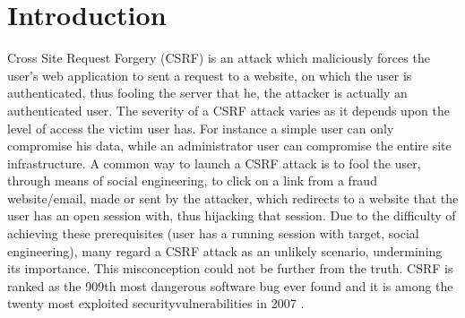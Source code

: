 \section{Introduction} 


Cross Site Request Forgery (CSRF) is an attack which maliciously forces the user's web application to sent a
request to a website, on which the user is authenticated, thus fooling the server that he, the attacker is 
actually an authenticated user.  The severity of a CSRF attack varies as it depends upon the level of access
the victim user has. For instance a simple user can only compromise his data, while an administrator user can
compromise the entire site infrastructure.  A common way to launch a CSRF attack is to fool the user, through
means of social engineering, to click on a link from a fraud website/email, made or sent by the attacker, 
which redirects to a website that the user has an open session with, thus hijacking that session.  Due to
the difficulty of achieving these prerequisites (user has a running session with target, social engineering),
many regard a CSRF attack as an unlikely scenario, undermining its importance.  This misconception could not
be further from the truth.  CSRF is ranked as the 909th most dangerous software bug ever found \cite{website:wiki-csrf-sever}
and it is among the twenty most exploited security\-vulnerabilities in 2007 \cite{Dhamija:2006:WPW:1124772.1124861}.



